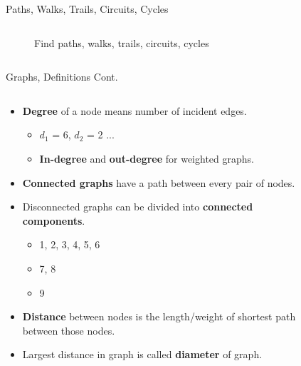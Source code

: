 \documentclass[aspectratio=169]{beamer}%
\begin{document}
\begin{frame}{Paths, Walks, Trails, Circuits, Cycles}
\begin{columns}[T]
\begin{column}{.30\textwidth}
\begin{figure}
                \caption{Find paths, walks, trails, circuits, cycles}%
            \end{figure}%
        \end{column}%
    \end{columns}%
    
\end{frame}

\begin{frame}{Graphs, Definitions Cont.}%
    \begin{columns}[T]%
        \begin{column}{.66\textwidth}%
            \begin{itemize}
                \item \textbf{Degree} of a node means number of incident edges.
                    \begin{itemize}
                        \item $d_1$ = 6, $d_2$ = 2 ...
                        \item \textbf{In-degree} and \textbf{out-degree} for weighted graphs.
                    \end{itemize}
                \item \textbf{Connected graphs} have a path between every pair of nodes. 
                \item Disconnected graphs can be divided into \textbf{connected components}.
                    \begin{multicols}{3}                    
                        \begin{itemize}
                            \item 1, 2, 3, 4, 5, 6
                            \item 7, 8
                            \item 9
                        \end{itemize}
                    \end{multicols}
                \item \textbf{Distance} between nodes is the length/weight of shortest path between those nodes.
                \item Largest distance in graph is called \textbf{diameter} of graph.
            \end{itemize}
        \end{column}%
        \hfill
        \begin{column}{.30\textwidth}%
            \begin{figure}%

\end{figure}
\end{column}
\end{columns}
\end{frame}
\end{document}
